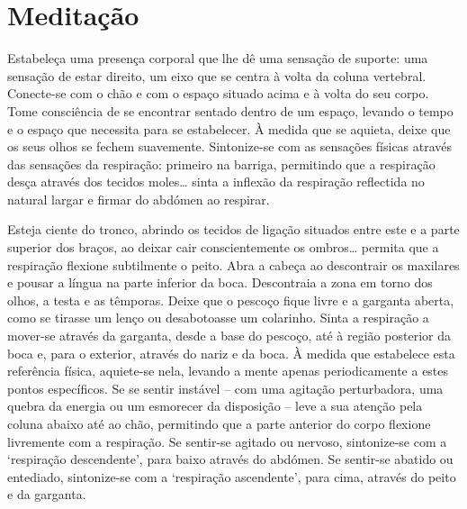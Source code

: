 
\chapter{Meditação}


Estabeleça uma presença corporal que lhe dê uma sensação de suporte: uma sensação de estar direito, um eixo que se centra à volta da coluna vertebral. Conecte-se com o chão e com o espaço situado acima e à volta do seu corpo. Tome consciência de se encontrar sentado dentro de um espaço, levando o tempo e o espaço que necessita para se estabelecer. À medida que se aquieta, deixe que os seus olhos se fechem suavemente. Sintonize-se com as sensações físicas através das sensações da respiração: primeiro na barriga, permitindo que a respiração desça através dos tecidos moles\ldots{} sinta a inflexão da respiração reflectida no natural largar e firmar do abdómen ao respirar.

Esteja ciente do tronco, abrindo os tecidos de ligação situados entre este e a parte superior dos braços, ao deixar cair conscientemente os ombros\ldots{} permita que a respiração flexione subtilmente o peito. Abra a cabeça ao descontrair os maxilares e pousar a língua na parte inferior da boca. Descontraia a zona em torno dos olhos, a testa e as têmporas. Deixe que o pescoço fique livre e a garganta aberta, como se tirasse um lenço ou desabotoasse um colarinho. Sinta a respiração a mover-se através da garganta, desde a base do pescoço, até à região posterior da boca e, para o exterior, através do nariz e da boca. À medida que estabelece esta referência física, aquiete-se nela, levando a mente apenas periodicamente a estes pontos específicos. Se se sentir instável -- com uma agitação perturbadora, uma quebra da energia ou um esmorecer da disposição -- leve a sua atenção pela coluna abaixo até ao chão, permitindo que a parte anterior do corpo flexione livremente com a respiração. Se sentir-se agitado ou nervoso, sintonize-se com a `respiração descendente', para baixo através do abdómen. Se sentir-se abatido ou entediado, sintonize-se com a `respiração ascendente', para cima, através do peito e da garganta.

